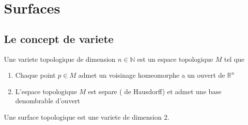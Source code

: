 \documentclass[../main.tex]{subfiles}
\begin{document}
\section{Surfaces}
\subsection{Le concept de variete}
\begin{defn}[Variete]
	Une variete topologique de dimension $n\in \mathbb{N}$ est un espace topologique $M$ tel que
	\begin{enumerate}
	\item Chaque point $p\in M$ admet un voisinage homeomorphe a un ouvert de $ \mathbb{R}^n$ 
	\item L'espace topologique $M$ est separe ( de Hausdorff) et admet une base denombrable d'ouvert
	\end{enumerate}
\end{defn}
\begin{defn}
	Une surface topologique est une variete de dimension 2.
\end{defn}
	
				

								
\end{document}
